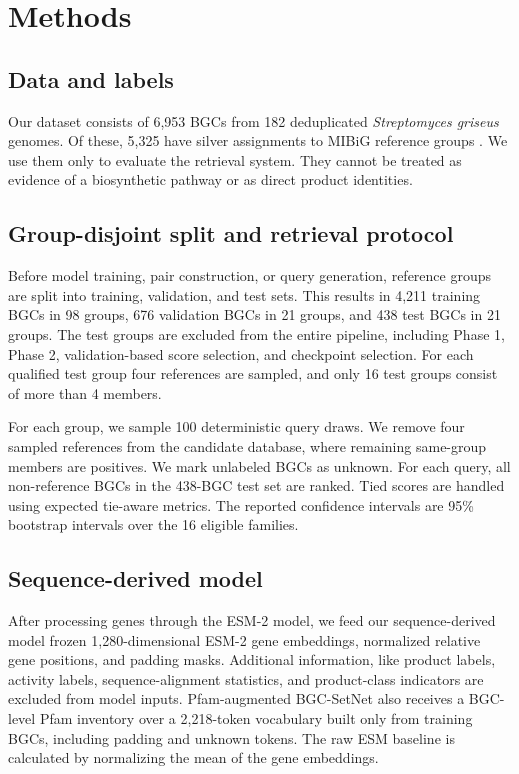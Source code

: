 \documentclass{article}
\begin{document}
\section{Methods}

\subsection{Data and labels}

Our dataset consists of 6,953 BGCs from 182 deduplicated \textit{Streptomyces griseus} genomes. Of these, 5,325 have silver assignments to MIBiG reference groups \cite{terlouw2023}. We use them only to evaluate the retrieval system. They cannot be treated as evidence of a biosynthetic pathway or as direct product identities.


\subsection{Group-disjoint split and retrieval protocol}

Before model training, pair construction, or query generation, reference groups are split into training, validation, and test sets. This results in 4,211 training BGCs in 98 groups, 676 validation BGCs in 21 groups, and 438 test BGCs in 21 groups. The test groups are excluded from the entire pipeline, including Phase 1, Phase 2, validation-based score selection, and checkpoint selection. For each qualified test group four references are sampled, and only 16 test groups consist of more than 4 members.

For each group, we sample 100 deterministic query draws. We remove four sampled references from the candidate database, where remaining same-group members are positives. We mark unlabeled BGCs as unknown. For each query, all non-reference BGCs in the 438-BGC test set are ranked. Tied scores are handled using expected tie-aware metrics. The reported confidence intervals are 95\% bootstrap intervals over the 16 eligible families.

\subsection{Sequence-derived model}

After processing genes through the ESM-2 model, we feed our sequence-derived model frozen 1,280-dimensional ESM-2 gene embeddings, normalized relative gene positions, and padding masks. Additional information, like product labels, activity labels, sequence-alignment statistics, and product-class indicators are excluded from model inputs. Pfam-augmented BGC-SetNet also receives a BGC-level Pfam inventory over a 2,218-token vocabulary built only from training BGCs, including padding and unknown tokens. The raw ESM baseline is calculated by normalizing the mean of the gene embeddings.
\end{document}
